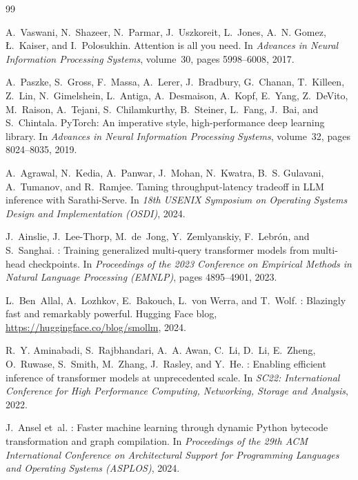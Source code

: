 \documentclass[11pt]{article}
\begin{document}

\begin{thebibliography}{99}

A.~Vaswani, N.~Shazeer, N.~Parmar, J.~Uszkoreit, L.~Jones, A.~N. Gomez, \L.~Kaiser, and I.~Polosukhin.
\newblock Attention is all you need.
\newblock In {\em Advances in Neural Information Processing Systems}, volume~30, pages 5998--6008, 2017.

A.~Paszke, S.~Gross, F.~Massa, A.~Lerer, J.~Bradbury, G.~Chanan, T.~Killeen, Z.~Lin, N.~Gimelshein, L.~Antiga, A.~Desmaison, A.~Kopf, E.~Yang, Z.~DeVito, M.~Raison, A.~Tejani, S.~Chilamkurthy, B.~Steiner, L.~Fang, J.~Bai, and S.~Chintala.
\newblock PyTorch: An imperative style, high-performance deep learning library.
\newblock In {\em Advances in Neural Information Processing Systems}, volume~32, pages 8024--8035, 2019.

A.~Agrawal, N.~Kedia, A.~Panwar, J.~Mohan, N.~Kwatra, B.~S. Gulavani, A.~Tumanov, and R.~Ramjee.
\newblock Taming throughput-latency tradeoff in {LLM} inference with {Sarathi-Serve}.
\newblock In {\em 18th USENIX Symposium on Operating Systems Design and Implementation (OSDI)}, 2024.

J.~Ainslie, J.~Lee-Thorp, M.~de~Jong, Y.~Zemlyanskiy, F.~Lebr{\'o}n, and S.~Sanghai.
: Training generalized multi-query transformer models from multi-head checkpoints.
\newblock In {\em Proceedings of the 2023 Conference on Empirical Methods in Natural Language Processing (EMNLP)}, pages 4895--4901, 2023.

L.~Ben~Allal, A.~Lozhkov, E.~Bakouch, L.~von Werra, and T.~Wolf.
: Blazingly fast and remarkably powerful.
\newblock Hugging Face blog, \url{https://huggingface.co/blog/smollm}, 2024.

R.~Y. Aminabadi, S.~Rajbhandari, A.~A. Awan, C.~Li, D.~Li, E.~Zheng, O.~Ruwase, S.~Smith, M.~Zhang, J.~Rasley, and Y.~He.
: Enabling efficient inference of transformer models at unprecedented scale.
\newblock In {\em SC22: International Conference for High Performance Computing, Networking, Storage and Analysis}, 2022.

J.~Ansel et~al.
: Faster machine learning through dynamic {Python} bytecode transformation and graph compilation.
\newblock In {\em Proceedings of the 29th ACM International Conference on Architectural Support for Programming Languages and Operating Systems (ASPLOS)}, 2024.


\end{thebibliography}
\end{document}
